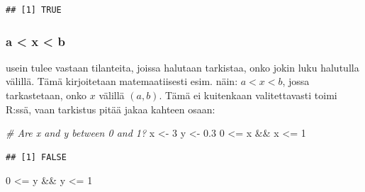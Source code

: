 \documentclass[
]{book}
\newenvironment{Shaded}{\begin{snugshade}}{\end{snugshade}}
\newcommand{\AttributeTok}[1]{\textcolor[rgb]{0.77,0.63,0.00}{#1}}
\newcommand{\CommentTok}[1]{\textcolor[rgb]{0.56,0.35,0.01}{\textit{#1}}}
\newcommand{\DecValTok}[1]{\textcolor[rgb]{0.00,0.00,0.81}{#1}}
\newcommand{\FloatTok}[1]{\textcolor[rgb]{0.00,0.00,0.81}{#1}}
\newcommand{\FunctionTok}[1]{\textcolor[rgb]{0.00,0.00,0.00}{#1}}
\newcommand{\NormalTok}[1]{#1}
\newcommand{\OtherTok}[1]{\textcolor[rgb]{0.56,0.35,0.01}{#1}}
\newcommand{\SpecialCharTok}[1]{\textcolor[rgb]{0.00,0.00,0.00}{#1}}
\newcommand{\StringTok}[1]{\textcolor[rgb]{0.31,0.60,0.02}{#1}}
\begin{document}
\begin{Shaded}
\end{Shaded}

\begin{verbatim}
## [1] TRUE
\end{verbatim}

\hypertarget{a-x-b}{%
\subsubsection{a \textless{} x \textless{} b}\label{a-x-b}}

usein tulee vastaan tilanteita, joissa halutaan tarkistaa, onko jokin luku halutulla välillä. Tämä kirjoitetaan matemaatiisesti esim. näin: \(a < x < b\), jossa tarkastetaan, onko \(x\) välillä \((a, b)\). Tämä ei kuitenkaan valitettavasti toimi R:ssä, vaan tarkistus pitää jakaa kahteen osaan:

\begin{Shaded}
\begin{Highlighting}[]
\CommentTok{\# Are x and y between 0 and 1?}
\NormalTok{x }\OtherTok{\textless{}{-}} \DecValTok{3}
\NormalTok{y }\OtherTok{\textless{}{-}} \FloatTok{0.3}
\DecValTok{0} \SpecialCharTok{\textless{}=}\NormalTok{ x }\SpecialCharTok{\&\&}\NormalTok{ x }\SpecialCharTok{\textless{}=} \DecValTok{1}
\end{Highlighting}
\end{Shaded}

\begin{verbatim}
## [1] FALSE
\end{verbatim}

\begin{Shaded}
\begin{Highlighting}[]
\DecValTok{0} \SpecialCharTok{\textless{}=}\NormalTok{ y }\SpecialCharTok{\&\&}\NormalTok{ y }\SpecialCharTok{\textless{}=} \DecValTok{1}
\end{Highlighting}
\end{Shaded}
\end{document}
